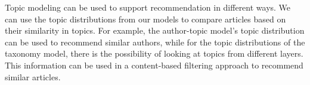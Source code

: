 Topic modeling can be used to support recommendation in different ways.
We can use the topic distributions from our models to compare articles based on their similarity in topics.
For example, the author-topic model's topic distribution can be used to recommend similar authors, while for the topic distributions of the taxonomy model, there is the possibility of looking at topics from different layers.
This information can be used in a content-based filtering approach to recommend similar articles.

